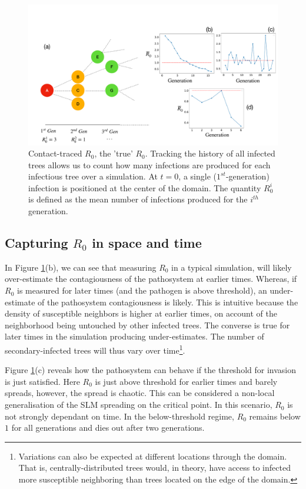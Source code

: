 \begin{figure}
    \centering
    \includegraphics[scale=0.255]{chapter5/figures_/fig1.pdf}
    \caption{Contact-traced $R_0$, the 'true' $R_0$. Tracking the history of all infected trees allows us to count how many infections are produced for each infectious tree over a simulation. At $t=0$, a single ($1^{st}$-generation) infection is positioned at the center of the domain. The quantity $R^i_0$ is defined as the mean number of infections produced for  the $i^{th}$ generation.}
    \label{fig:contact-trace}
\end{figure}


\subsection{Capturing $R_0$ in space and time}

In Figure \ref{fig:contact-trace}(b), we can see that measuring $R_0$ in a typical simulation, %
will likely over-estimate the contagiousness of the pathosystem at earlier times. %
Whereas, if $R_0$ is measured for later times (and the pathogen is above threshold), an %
under-estimate of the pathosystem contagiousness is likely. %
This is intuitive because the density of susceptible neighbors is higher at earlier times, %
on account of the neighborhood being untouched by other infected trees. %
The converse is true for later times in the simulation producing under-estimates. %
The number of secondary-infected trees will thus vary over time\footnote{Variations can %
also be expected at different locations through the domain. That is, centrally-distributed %
trees would, in theory, have access to infected more susceptible neighboring than trees %
located on the edge of the domain.}. %

Figure \ref{fig:contact-trace}(c) reveals how the pathosystem can behave if the threshold for %
invasion is just satisfied. %
Here $R_0$ is just above threshold for earlier times and barely spreads, however, the spread is chaotic. %
This can be considered a non-local generalisation of the SLM spreading on the critical point. %
In this scenario, $R_0$ is not strongly dependant on time. %
In the below-threshold regime, $R_0$ remains below $1$ for all generations and dies out after %
two generations. %

